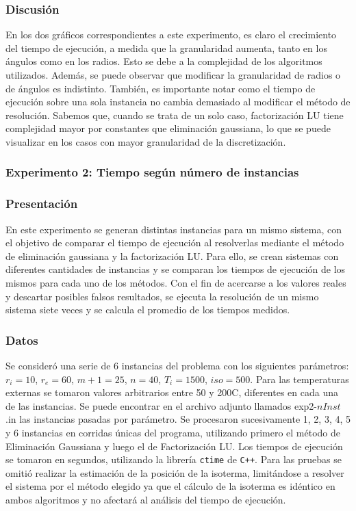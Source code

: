      \subsubsection*{Discusión}
        En los dos gráficos correspondientes a este experimento, es claro el crecimiento del tiempo de ejecución, a medida que la granularidad aumenta, tanto en los ángulos como en los radios. Esto se debe a la complejidad de los algoritmos utilizados. 
        Además, se puede observar que modificar la granularidad de radios o de ángulos es indistinto.
        También, es importante notar como el tiempo de ejecución sobre una sola instancia no cambia demasiado al modificar el método de resolución. Sabemos que, cuando se trata de un solo caso, factorización LU tiene complejidad mayor por constantes que eliminación gaussiana, lo que se puede visualizar en los casos con mayor granularidad de la discretización.


    \subsubsection*{Experimento 2: Tiempo según número de instancias} 

         \subsubsection*{Presentación}
          En este experimento se generan distintas instancias para un mismo sistema, con el objetivo de comparar el tiempo de ejecución al resolverlas mediante el método de eliminación gaussiana y la factorización LU. 
          Para ello, se crean sistemas con diferentes cantidades de instancias y se comparan los tiempos de ejecución de los mismos para cada uno de los métodos. Con el fin de acercarse a los valores reales y descartar posibles falsos resultados, se ejecuta la resolución de un mismo sistema siete veces y se calcula el promedio de los tiempos medidos. 

      \subsubsection*{Datos}
          Se consideró una serie de 6 instancias del problema con los siguientes parámetros: $r_i = 10$, $r_e = 60$, $m+1 = 25$, $n = 40$, $T_i = 1500$, $iso = 500$. Para las temperaturas externas se tomaron valores arbitrarios entre 50 y 200{\degree}C, diferentes en cada una de las instancias. Se puede encontrar en el archivo adjunto llamados exp2-$nInst$.in las instancias pasadas por parámetro.
          Se procesaron sucesivamente 1, 2, 3, 4, 5 y 6 instancias en corridas únicas del programa, utilizando primero el método de Eliminación Gaussiana y luego el de Factorización LU. Los tiempos de ejecución se tomaron en segundos, utilizando la librería \texttt{ctime} de \texttt{C++}. Para las pruebas se omitió realizar la estimación de la posición de la isoterma, limitándose a resolver el sistema por el método elegido ya que el cálculo de la isoterma es idéntico en ambos algoritmos y no afectará al análisis del tiempo de ejecución. 

